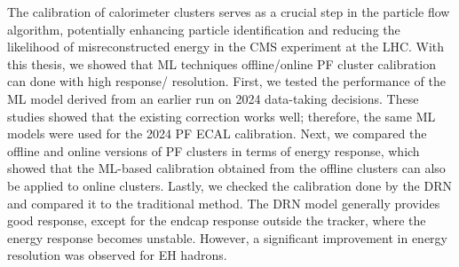The calibration of calorimeter clusters serves as a crucial step in the particle flow algorithm, potentially enhancing particle identification and reducing the likelihood of misreconstructed energy in the CMS experiment at the LHC. With this thesis, we showed that ML techniques offline/online PF cluster calibration can done with high response/ resolution. First, we tested the performance of the ML model derived from an earlier run on 2024 data-taking decisions. These studies showed that the existing correction works well; therefore, the same ML models were used for the 2024 PF ECAL calibration. Next, we compared the offline and online versions of PF clusters in terms of energy response, which showed that the ML-based calibration obtained from the offline clusters can also be applied to online clusters. Lastly, we checked the calibration done by the DRN and compared it to the traditional method. The DRN model generally provides good response, except for the endcap response outside the tracker, where the energy response becomes unstable. However, a significant improvement in energy resolution was observed for EH hadrons. 












